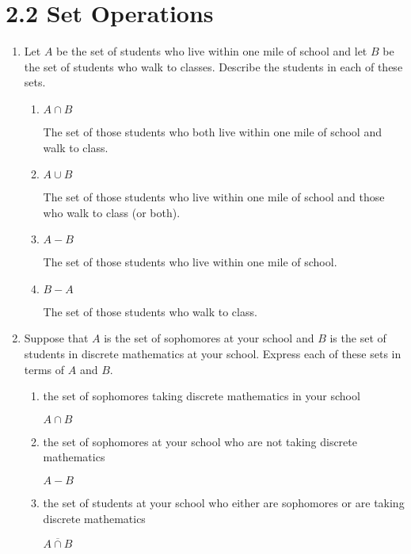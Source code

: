 \documentclass[11pt]{article}
\begin{document}
\pagebreak
\section*{\textbf{2.2 Set Operations}}
\begin{enumerate}[label=\textbf{\arabic*.}]
	\item Let $A$ be the set of students who live within one mile of school and let $B$ be the set of students who walk to classes. Describe the students in each of these sets.
	
	\begin{enumerate}[label=\textbf{\alph*)}]
		\item $A \cap B$
		
		The set of those students who both live within one mile of school and walk to class.
		
		\item $A \cup B$
		
		The set of those students who live within one mile of school and those who walk to class (or both).
		
		\item $A - B$
		
		The set of those students who live within one mile of school.
		
		\item $B - A$
		
		The set of those students who walk to class.
	\end{enumerate}

	\item Suppose that $A$ is the set of sophomores at your school and $B$ is the set of students in discrete mathematics at your school. Express each of these sets in terms of $A$ and $B$.
	
	\begin{enumerate}[label=\textbf{\alph*)}]
		\item the set of sophomores taking discrete mathematics in your school
		
		$A \cap B$
		
		\item the set of sophomores at your school who are not taking discrete mathematics
		
		$A - B$
		
		\item the set of students at your school who either are sophomores or are taking discrete mathematics
		
		$\overline{A \cap B}$
		

\end{enumerate}
\end{enumerate}
\end{document}
